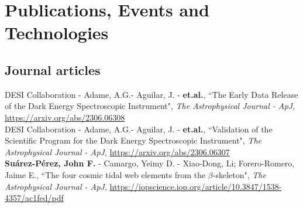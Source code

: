\documentclass[10pt, a4paper]{article}
\newcommand{\years}[1]{\marginnote{\scriptsize #1}}
\begin{document}
\iffalse
\section*{Invited Research Visits}
\noindent
\years{2022}\textsc{Visiting Researcher}. Natural Science Research Institute, University of Seoul. Seoul-Republic of Korea. {August-October}.\\

\years{2022}\textsc{Visiting Researcher}. Institute of Computational Cosmology, Durham University. Durham-UK. {June-July}.\\

\years{2019}\textsc{Visiting Researcher}. Max Planck Institute for Astrophysics. Munich-Germany. 
{June}.\\

\section*{Honors and Awards}
\noindent
\years{2014}\textbf{Honor distinction for excellence in graduation work.} Laureate Thesis Award. 
Highest honor awarded for outstanding research work. Bachelor in Physics degree. Universidad 
Distrital Francisco José de Caldas - Bogotá, Colombia.
\fi

\iffalse
\section*{Publications, Events and Technologies}

\subsection*{Journal articles}
\noindent
\years{2023}DESI Collaboration - Adame, A.G.- Aguilar, J. - \textbf{et.al.}, “The Early Data 
Release 
of the Dark Energy Spectroscopic Instrument", \emph{The Astrophysical Journal - ApJ}, 
\url{https://arxiv.org/abs/2306.06308} 
\\

\years{2023}DESI Collaboration - Adame, A.G.- Aguilar, J. - \textbf{et.al.}, “Validation of the 
Scientific Program for the Dark Energy Spectroscopic Instrument", \emph{The Astrophysical Journal - 
ApJ}, 
\url{https://arxiv.org/abs/2306.06307} 
\\

\years{2021}\textbf{Suárez-Pérez, John F.} - Camargo, Yeimy D. - Xiao-Dong, Li; Forero-Romero, Jaime E., “The four cosmic tidal web elements from the $\beta$-skeleton", \emph{The Astrophysical Journal - ApJ}, \url{https://iopscience.iop.org/article/10.3847/1538-4357/ac1fed/pdf}
\\
\end{document}
